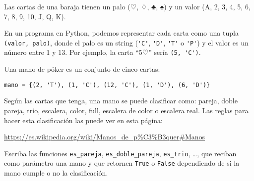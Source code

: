 Las cartas de una baraja tienen
un palo (♡, ♢, ♣, ♠)
y un valor (A, 2, 3, 4, 5, 6, 7, 8, 9, 10, J, Q, K).

En un programa en Python,
podemos representar cada carta
como una tupla \texttt{(valor, palo)},
donde el palo es un string
(\lstinline!'C'!, \lstinline!'D'!, \lstinline!'T'! o \lstinline!'P'!)
y el valor es un número entre 1 y 13.
Por ejemplo,
la carta ``5♡'' sería \lstinline!(5, 'C')!.

Una mano de póker es un conjunto de cinco cartas:
\begin{lstlisting}
mano = {(2, 'T'), (1, 'C'), (12, 'C'), (1, 'D'), (6, 'D')}
\end{lstlisting}

Según las cartas que tenga,
una mano se puede clasificar como:
pareja, doble pareja, trío, escalera,
color, full, escalera de color o escalera real.
Las reglas para hacer esta clasificación
las puede ver en esta página:

\url{https://es.wikipedia.org/wiki/Manos_de_p%C3%B3quer#Manos}

Escriba las funciones
\lstinline!es_pareja!,
\lstinline!es_doble_pareja!,
\lstinline!es_trio!,
\dots,
que reciban como parámetro una mano
y que retornen \verb!True! o \verb!False!
depen\-diendo de si la mano cumple o no la clasificación.






